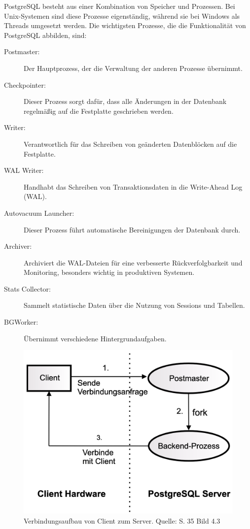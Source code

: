 PostgreSQL besteht aus einer Kombination von Speicher und Prozessen. Bei Unix-Systemen sind diese Prozesse eigenständig, während sie bei Windows als Threads umgesetzt werden. Die wichtigsten Prozesse, die die Funktionalität von PostgreSQL abbilden, sind:
\begin{description}
    \item[Postmaster:] Der Hauptprozess, der die Verwaltung der anderen Prozesse übernimmt.
    \item[Checkpointer:] Dieser Prozess sorgt dafür, dass alle Änderungen in der Datenbank regelmäßig auf die Festplatte geschrieben werden.
    \item[Writer:] Verantwortlich für das Schreiben von geänderten Datenblöcken auf die Festplatte.
    \item[WAL Writer:] Handhabt das Schreiben von Transaktionsdaten in die Write-Ahead Log (WAL).
    \item[Autovacuum Launcher:] Dieser Prozess führt automatische Bereinigungen der Datenbank durch.
    \item[Archiver:] Archiviert die WAL-Dateien für eine verbesserte Rückverfolgbarkeit und Monitoring, besonders wichtig in produktiven Systemen.
    \item[Stats Collector:] Sammelt statistische Daten über die Nutzung von Sessions und Tabellen.
    \item[BGWorker:] Übernimmt verschiedene Hintergrundaufgaben.
\end{description}

\begin{figure}[h]
\centering
\includegraphics[width=\textwidth]{img/PostgreSQL Verbindungsaufbau.png}
\caption{Verbindungsaufbau von Client zum Server. Quelle: \cite{Froehlich2022} S. 35 Bild 4.3}
\label{fig:Verbindungsaufbau}
\end{figure}

